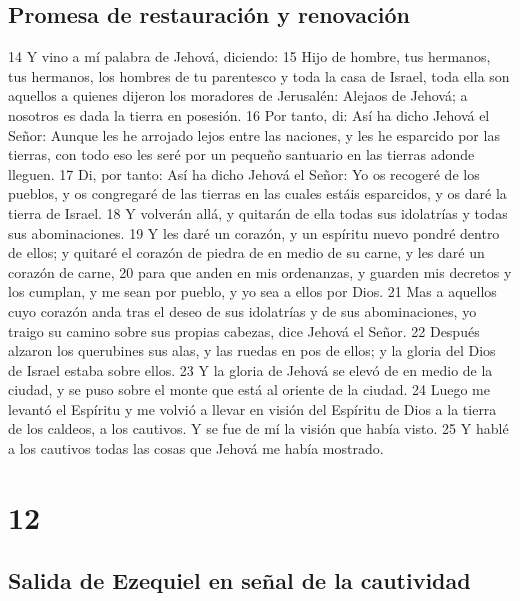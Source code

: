 \section*{Promesa de restauración y renovación}

14 Y vino a mí palabra de Jehová, diciendo:
15 Hijo de hombre, tus hermanos, tus hermanos, los hombres de tu parentesco y toda la casa de Israel, toda ella son aquellos a quienes dijeron los moradores de Jerusalén: Alejaos de Jehová; a nosotros es dada la tierra en posesión.
16 Por tanto, di: Así ha dicho Jehová el Señor: Aunque les he arrojado lejos entre las naciones, y les he esparcido por las tierras, con todo eso les seré por un pequeño santuario en las tierras adonde lleguen.
17 Di, por tanto: Así ha dicho Jehová el Señor: Yo os recogeré de los pueblos, y os congregaré de las tierras en las cuales estáis esparcidos, y os daré la tierra de Israel.
18 Y volverán allá, y quitarán de ella todas sus idolatrías y todas sus abominaciones.
19 Y les daré un corazón, y un espíritu nuevo pondré dentro de ellos; y quitaré el corazón de piedra de en medio de su carne, y les daré un corazón de carne,
20 para que anden en mis ordenanzas, y guarden mis decretos y los cumplan, y me sean por pueblo, y yo sea a ellos por Dios. 
21 Mas a aquellos cuyo corazón anda tras el deseo de sus idolatrías y de sus abominaciones, yo traigo su camino sobre sus propias cabezas, dice Jehová el Señor.
22 Después alzaron los querubines sus alas, y las ruedas en pos de ellos; y la gloria del Dios de Israel estaba sobre ellos.
23 Y la gloria de Jehová se elevó de en medio de la ciudad, y se puso sobre el monte que está al oriente de la ciudad. 
24 Luego me levantó el Espíritu y me volvió a llevar en visión del Espíritu de Dios a la tierra de los caldeos, a los cautivos. Y se fue de mí la visión que había visto.
25 Y hablé a los cautivos todas las cosas que Jehová me había mostrado.

\chapter{12}

\section*{Salida de Ezequiel en señal de la cautividad}

